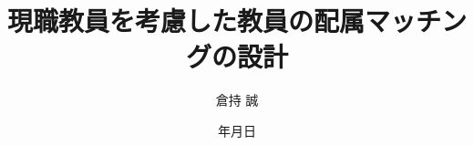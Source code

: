 \documentclass[12pt, a4paper]{article}
\renewcommand{\today}{\number\year 年\number\month 月\number\day 日} %
\theoremstyle{definition}
\theoremstyle{remark}
\theoremstyle{plain}
\begin{document}
\title{現職教員を考慮した教員の配属マッチングの設計} 
\author{倉持 誠}
\date{\today} %

\maketitle %
\begin{abstract}
    \noindent %





    \vspace{1cm} %
    \noindent %

\end{abstract}
\end{document}
